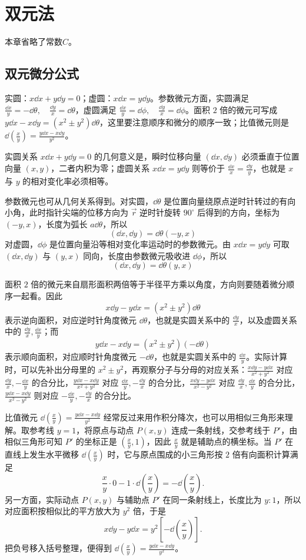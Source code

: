 \section{双元法}
本章省略了常数$C$。
\subsection{双元微分公式}
\begin{theorem}[微分公式]
实圆：$x\dd x+y\dd y=0$；虚圆：$x\dd x=y\dd y$。参数微元方面，实圆满足 $\frac{\dd x}{y}=-\dd\theta, \quad \frac{\dd y}{x}=\dd\theta$，虚圆满足 $\frac{\dd x}{y}=\dd\phi,\quad \frac{\dd y}{x}=\dd\phi$。面积 $2$ 倍的微元可写成 $y\dd x-x\dd y=(x^2\pm y^2)\dd\theta$，这里要注意顺序和微分的顺序一致；比值微元则是 $\dd\left(\frac{x}{y}\right)=\frac{y\dd x-x\dd y}{y^2}$。
\end{theorem}
实圆关系 $x\dd x+y\dd y=0$ 的几何意义是，瞬时位移向量 $(\dd x, \dd y)$ 必须垂直于位置向量 $(x,y)$，二者内积为零；虚圆关系 $x\dd x=y\dd y$ 则等价于 $\frac{\dd x}{x} = \frac{\dd y}{y}$，也就是 $x$ 与 $y$ 的相对变化率必须相等。

参数微元也可从几何关系得到。对实圆，$\dd\theta$ 是位置向量绕原点逆时针转过的有向小角，此时指针尖端的位移方向为 $\vec{r}$ 逆时针旋转 $90^\circ$ 后得到的方向，坐标为 $(-y,x)$，长度为弧长 $a\dd\theta$，所以
\[(\dd x, \dd y)=\dd\theta(-y,x)\]
对虚圆，$\dd\phi$ 是位置向量沿等相对变化率运动时的参数微元。由 \(x\dd x=y\dd y\) 可取 \((\dd x,\dd y)\) 与 \((y,x)\) 同向，长度由参数微元吸收进 \(\dd\phi\)，所以
\[(\dd x, \dd y)=\dd\theta(y,x)\]

面积 $2$ 倍的微元来自扇形面积两倍等于半径平方乘以角度，方向则要随着微分顺序一起看。因此
\[
x\dd y-y\dd x=(x^2\pm y^2)\dd\theta
\]
表示逆向面积，对应逆时针角度微元 $\dd\theta$，也就是实圆关系中的 $\frac{\dd y}{x}$，以及虚圆关系中的 $\frac{\dd y}{x},\frac{\dd x}y$；而
\[
y\dd x-x\dd y=(x^2\pm y^2)(-\dd\theta)
\]
表示顺向面积，对应顺时针角度微元 $-\dd\theta$，也就是实圆关系中的 $\frac{\dd x}{y}$。实际计算时，可以先补出分母里的 \(x^2\pm y^2\)，再观察分子与分母的对应关系：$\frac{x\dd y-y\dd x}{x^2+y^2}$ 对应 $\frac{\dd y}{x},-\frac{\dd x}{y}$ 的合分比，$\frac{y\dd x-x\dd y}{x^2+y^2}$ 对应 $\frac{\dd x}{y},-\frac{\dd y}{x}$ 的合分比，$\frac{x\dd y-y\dd x}{x^2-y^2}$ 对应 $\frac{\dd y}{x},\frac{\dd x}{y}$ 的合分比，$\frac{y\dd x-x\dd y}{x^2-y^2}$ 则对应 $-\frac{\dd x}{y},-\frac{\dd y}{x}$ 的合分比。

比值微元 $\dd\left(\frac{x}{y}\right)=\frac{y\dd x-x\dd y}{y^2}$ 经常反过来用作积分降次，也可以用相似三角形来理解。取参考线 $y=1$，将原点与动点 $P(x,y)$ 连成一条射线，交参考线于 $P'$，由相似三角形可知 $P'$ 的坐标正是 $\left(\frac{x}{y}, 1\right)$，因此 $\frac{x}{y}$ 就是辅助点的横坐标。当 $P'$ 在直线上发生水平微移 $\dd\left(\frac{x}{y}\right)$ 时，它与原点围成的小三角形按 $2$ 倍有向面积计算满足
\[
\frac{x}{y}\cdot 0 - 1\cdot\dd\left(\frac{x}{y}\right) = -\dd\left(\frac{x}{y}\right).
\]
另一方面，实际动点 $P(x,y)$ 与辅助点 $P'$ 在同一条射线上，长度比为 $y:1$，所以对应面积按相似比的平方放大为 $y^2$ 倍，于是
\[ x\dd y - y\dd x = y^2 \left[ -\dd\left(\frac{x}{y}\right) \right]. \]
把负号移入括号整理，便得到 $\dd\left(\frac{x}{y}\right)=\frac{y\dd x-x\dd y}{y^2}$。

